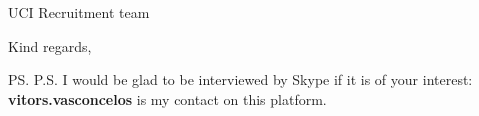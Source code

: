 \documentclass{letter}
\begin{document}
\begin{letter}{UCI Recruitment team}
  \closing{Kind regards,}

  \ps
  P.S. I would be glad to be interviewed by Skype if it is of
  your interest: \textbf{vitors.vasconcelos} is my contact on this
  platform.
  
\end{letter}
\end{document}
